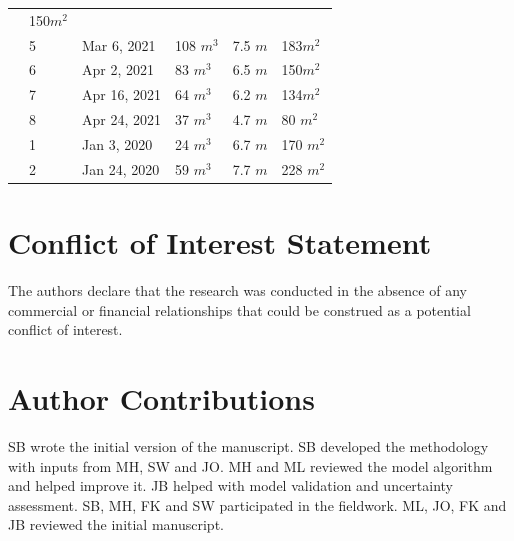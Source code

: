 \documentclass[utf8]{frontiersSCNS} %
\begin{document}
\begin{table}
\begin{tabular}{@{}|llllll|@{}}
		                       & 150$m^{2}$                                                                       \\
		\multicolumn{1}{|l|}{} & 5            & Mar 6, 2021   & 108 $m^{3}$     & 7.5 $m$
		                       & 183$m^{2}$                                                                       \\
		\multicolumn{1}{|l|}{} & 6            & Apr 2, 2021   & 83 $m^{3}$      & 6.5 $m$
		                       & 150$m^{2}$                                                                       \\
		\multicolumn{1}{|l|}{} & 7            & Apr 16, 2021  & 64 $m^{3}$      & 6.2 $m$
		                       & 134$m^{2}$                                                                       \\
		\multicolumn{1}{|l|}{} & 8            & Apr 24, 2021  & 37 $m^{3}$      & 4.7 $m$
		                       & 80 $m^{2}$                                                                       \\
		\midrule
		\multicolumn{1}{|l|}{\multirow{2}{*}{\rotatebox[origin=c]{90}{CH20}}}
		                       & 1            & Jan 3, 2020   & 24 $m^{3}$      & 6.7 $m$
		                       & 170 $m^{2}$                                                                      \\
		\multicolumn{1}{|l|}{} & 2            & Jan 24, 2020  & 59 $m^{3}$      & 7.7 $m$
		                       & 228 $m^{2}$                                                                      \\
		\midrule
	\end{tabular}

\end{table}


\section*{Conflict of Interest Statement} The authors declare that the research was conducted in the absence of any
commercial or financial relationships that could be construed as a potential conflict of interest.

\section*{Author Contributions} SB wrote the initial version of the manuscript. SB developed the methodology with
inputs from MH, SW and JO. MH and ML reviewed the model algorithm and helped improve it. JB helped with model validation and uncertainty assessment.
SB, MH, FK and SW participated in the fieldwork. ML, JO, FK and JB reviewed the initial manuscript.
\end{document}

